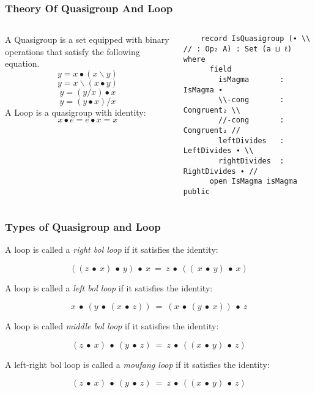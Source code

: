 \documentclass[xcolor={dvipsnames}]{beamer}
\begin{document}
\begin{frame}[fragile]
  \frametitle{Theory Of Quasigroup And Loop}  
  \begin{columns}
    \begin{column}{0.4\textwidth}
      A Quasigroup is a set equipped with binary operations that satisfy the
      following equation.
            \[y=x∙(x\backslash y)\]
            \[y=x\backslash(x∙y)\]
            \[y=(y/x)∙x\]
            \[y=(y∙x)/x\]
      A Loop is a quasigroup with identity:
      \[x∙e=e∙x=x\]
    \end{column}
    \hfill
    \begin{column}{0.575\textwidth}
\begin{verbatim}
    record IsQuasigroup (∙ \\ // : Op₂ A) : Set (a ⊔ ℓ) where
      field
        isMagma       : IsMagma ∙
        \\-cong       : Congruent₂ \\
        //-cong       : Congruent₂ //
        leftDivides   : LeftDivides ∙ \\
        rightDivides  : RightDivides ∙ //
      open IsMagma isMagma public
\end{verbatim}
    \end{column}
  \end{columns}
\end{frame}


\begin{frame}[fragile]
  \frametitle{Types of Quasigroup and Loop}

  A loop is called a \textit{right bol loop} if it satisfies the identity:

   \[((z\ ∙\ x)\ ∙\ y)\ ∙\ x\ =\ z\ ∙\ ((\ x\ ∙\ y)\ ∙\ x)\]

  A loop is called a \textit{left bol loop} if it satisfies the identity:

   \[x\ ∙\ (y\ ∙\ (x\ ∙\ z))\ =\ (x\ ∙\ (y\ ∙\ x))\ ∙\ z\]

  A loop is called \textit{middle bol loop} if it satisfies the identity:

  \[(z\ ∙\ x)\ ∙\ (y\ ∙\ z)\ =\ z\ ∙\ ((x\ ∙\ y)\ ∙\ z)\]

  A left-right bol loop is called a \textit{moufang loop} if it satisfies the identity:

  \[(z\ ∙\ x)\ ∙\ (y\ ∙\ z)\ =\ z\ ∙\ ((x\ ∙\ y)\ ∙\ z)\]

\end{frame}
\end{document}
